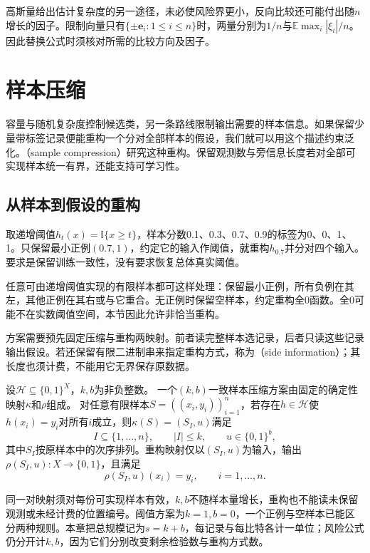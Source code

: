 高斯量给出估计复杂度的另一途径，未必使风险界更小，反向比较还可能付出随$n$增长的因子。限制向量只有$\{\pm\bm e_i:1\leq i\leq n\}$时，两量分别为$1/n$与$\mathbb E\max_i|\xi_i|/n$。因此替换公式时须核对所需的比较方向及因子。

\section{样本压缩}
\label{sec:sample-compression}

容量与随机复杂度控制候选类，另一条路线限制输出需要的样本信息。如果保留少量带标签记录便能重构一个分对全部样本的假设，我们就可以用这个描述约束泛化。（sample compression）研究这种重构。保留观测数与旁信息长度若对全部可实现样本统一有界，还能支持可学习性。

\subsection{从样本到假设的重构}

取递增阈值$h_t(x)=\mathbb I\{x\geq t\}$，样本分数0.1、0.3、0.7、0.9的标签为0、0、1、1。只保留最小正例$(0.7,1)$，约定它的输入作阈值，就重构$h_{0.7}$并分对四个输入。要求是保留训练一致性，没有要求恢复总体真实阈值。

任意可由递增阈值实现的有限样本都可这样处理：保留最小正例，所有负例在其左，其他正例在其右或与它重合。无正例时保留空样本，约定重构全0函数。全0可能不在实数阈值空间，本节因此允许非恰当重构。

方案需要预先固定压缩与重构两映射。前者读完整样本选记录，后者只读这些记录输出假设。若还保留有限二进制串来指定重构方式，称为（side information）；其长度也须计费，不能用它无界保存原数据。

\begin{definition}[一致样本压缩方案]
\label{def:sample-compression}
设$\mathcal H\subseteq\{0,1\}^X$，$k,b$为非负整数。
一个$(k,b)$一致样本压缩方案由固定的确定性映射$\kappa$和$\rho$组成。
对任意有限样本$S=((x_i,y_i))_{i=1}^n$，若存在$h\in\mathcal H$使
$h(x_i)=y_i$对所有$i$成立，则$\kappa(S)=(S_I,u)$满足
\[
 I\subseteq\{1,\ldots,n\},\qquad |I|\leq k,\qquad u\in\{0,1\}^b,
\]
其中$S_I$按原样本中的次序排列。重构映射仅以$(S_I,u)$为输入，输出
$\rho(S_I,u):X\to\{0,1\}$，且满足
\[
 \rho(S_I,u)(x_i)=y_i,\qquad i=1,\ldots,n.
\]
\end{definition}

同一对映射须对每份可实现样本有效，$k,b$不随样本量增长，重构也不能读未保留观测或未经计费的位置编号。阈值方案为$k=1,b=0$，一个正例与空样本已能区分两种规则。本章把总规模记为$s=k+b$，每记录与每比特各计一单位；风险公式仍分开计$k,b$，因为它们分别改变剩余检验数与重构方式数。


